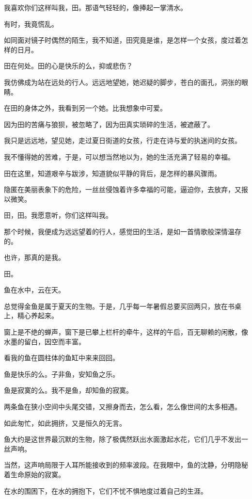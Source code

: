 \documentclass[12pt,a4paper]{article}
\def\blankrev{\vspace{1ex}}									%
\begin{document}
		我喜欢你们这样叫我，田。那语气轻轻的，像捧起一掌清水。\par
		有时，我竟慌乱。\par
		如同面对镜子时偶然的陌生，我不知道，田究竟是谁，是怎样一个女孩，度过着怎样的日月。\par
		田在何处。田的心是快乐的么，抑或悲伤？\par
		我仿佛成为站在远处的行人。远远地望她，她迟疑的脚步，苍白的面孔，洞张的眼睛。\par
		在田的身体之外，我看到另一个她。比我想象中可爱。\par
		因为田的苦痛与狼狈，被忽略了，因为田真实琐碎的生活，被遮蔽了。\par
		我只是远远地，望见她，走过夏日街道的女孩，行走在诗与爱的执迷间的女孩。\par
		我不懂得她的苦难，于是，可以想当然地以为，她的生活充满了轻易的幸福。\par
		田在这里，知道艰辛与跋涉，知道貌似平静的背后，是怎样的暴风骤雨。\par
		隐匿在美丽表象下的危险，一丝丝侵蚀着许多幸福的可能，逼迫你，去放弃，又报以微笑。\par
		田，田。我愿意听，你们这样叫我。\par
		那个时候，我便成为远远望着的行人，感觉田的生活，是如一首情歌般深情温存的。\par
		也许，那真的是我。\par
		田。

	\endwriting



		鱼在水中，云在天。

		\blankrev \blankrev
		总觉得金鱼是属于夏天的生物。于是，几乎每一年暑假总要买回两只，放在书桌上，精心养起来。\par
		窗上是不绝的蝉声，窗下是已攀上栏杆的牵牛，这样的午后，百无聊赖的闲散，像水墨的留白，因空而丰富。

		\blankrev
		看我的鱼在圆柱体的鱼缸中来来回回。

		\blankrev
		鱼是快乐的么。子非鱼，安知鱼之乐。\par
		鱼是寂寞的么。我不是鱼，却知鱼的寂寞。\par
		两条鱼在狭小空间中头尾交错，又擦身而去，怎么看，怎么像世间的太多相遇。\par
		如此匆忙，如此拥挤，又是恒久的无言。

		\blankrev
		鱼大约是这世界最沉默的生物，除了极偶然跃出水面激起水花，它们几乎不发出一丝声响。\par
		当然，这声响局限于人耳所能接收到的频率波段。在我眼中，鱼的沈静，分明隐秘着生命原始的寂寞。\par
		在水的围困下，在水的拥抱下，它们不忧不惧地度过着自己的生涯。
\end{document}
